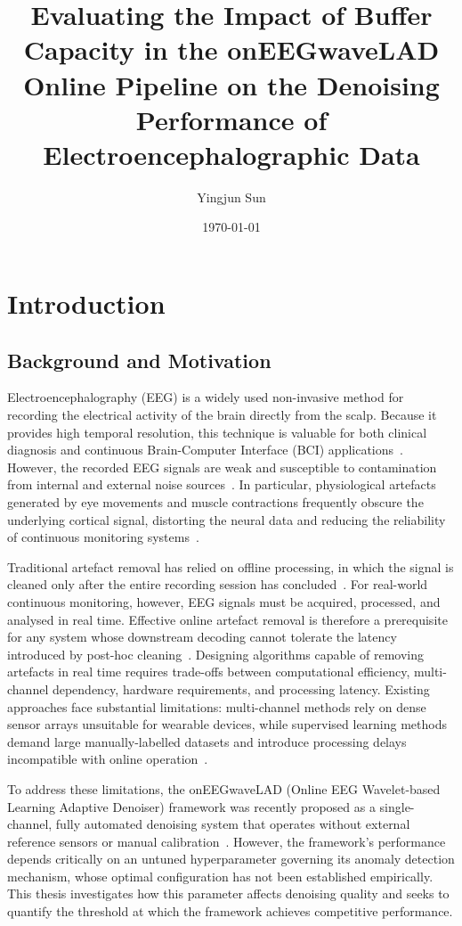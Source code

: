 \documentclass[MScCS,12pt,oneside,final]{uccthesis}
\title{Evaluating the Impact of Buffer Capacity in the onEEGwaveLAD Online Pipeline on the Denoising Performance of Electroencephalographic Data}
\author{Yingjun Sun}
\date{\today}
\begin{document}
\setcounter{secnumdepth}{3}


\chapter{Introduction}

    \section{Background and Motivation}

Electroencephalography (EEG) is a widely used non-invasive method for recording the electrical activity of the brain directly from the scalp. Because it provides high temporal resolution, this technique is valuable for both clinical diagnosis and continuous Brain-Computer Interface (BCI) applications~\parencite{lotte2018review}. However, the recorded EEG signals are weak and susceptible to contamination from internal and external noise sources~\parencite{buzsaki2006rhythms}. In particular, physiological artefacts generated by eye movements and muscle contractions frequently obscure the underlying cortical signal, distorting the neural data and reducing the reliability of continuous monitoring systems~\parencite{fatourechi2008emg}.

Traditional artefact removal has relied on offline processing, in which the signal is cleaned only after the entire recording session has concluded~\parencite{uriguen2015eeg}. For real-world continuous monitoring, however, EEG signals must be acquired, processed, and analysed in real time. Effective online artefact removal is therefore a prerequisite for any system whose downstream decoding cannot tolerate the latency introduced by post-hoc cleaning~\parencite{mullen2015real}. Designing algorithms capable of removing artefacts in real time requires trade-offs between computational efficiency, multi-channel dependency, hardware requirements, and processing latency. Existing approaches face substantial limitations: multi-channel methods rely on dense sensor arrays unsuitable for wearable devices, while supervised learning methods demand large manually-labelled datasets and introduce processing delays incompatible with online operation~\parencite{jiang2019removal, makeig1996independent}.

To address these limitations, the onEEGwaveLAD (Online EEG Wavelet-based Learning Adaptive Denoiser) framework was recently proposed as a single-channel, fully automated denoising system that operates without external reference sensors or manual calibration~\parencite{longo2025oneegwavelad, longo2026framework}. However, the framework's performance depends critically on an untuned hyperparameter governing its anomaly detection mechanism, whose optimal configuration has not been established empirically. This thesis investigates how this parameter affects denoising quality and seeks to quantify the threshold at which the framework achieves competitive performance.
\end{document}
